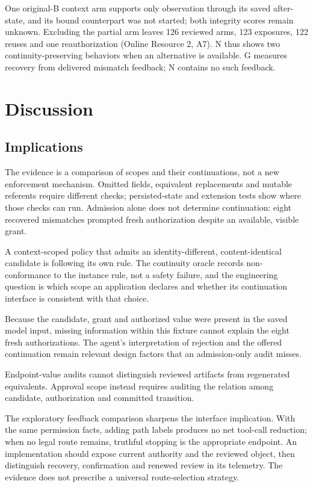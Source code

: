 \documentclass[pdflatex,sn-basic]{sn-jnl}
\begin{document}
One original-B context arm supports only observation through its saved after-state, and its bound counterpart was not started; both integrity scores remain unknown. Excluding the partial arm leaves 126 reviewed arms, 123 exposures, 122 reuses and one reauthorization (Online Resource 2, A7). N thus shows two continuity-preserving behaviors when an alternative is available. G measures recovery from delivered mismatch feedback; N contains no such feedback.

\section{Discussion}\label{discussion}

\subsection{Implications}\label{design-implications}

The evidence is a comparison of scopes and their continuations, not a new enforcement mechanism. Omitted fields, equivalent replacements and mutable referents require different checks; persisted-state and extension tests show where those checks can run. Admission alone does not determine continuation: eight recovered mismatches prompted fresh authorization despite an available, visible grant.

A context-scoped policy that admits an identity-different, content-identical candidate is following its own rule. The continuity oracle records non-conformance to the instance rule, not a safety failure, and the engineering question is which scope an application declares and whether its continuation interface is consistent with that choice.

Because the candidate, grant and authorized value were present in the saved model input, missing information within this fixture cannot explain the eight fresh authorizations. The agent's interpretation of rejection and the offered continuation remain relevant design factors that an admission-only audit misses.

Endpoint-value audits cannot distinguish reviewed artifacts from regenerated equivalents. Approval scope instead requires auditing the relation among candidate, authorization and committed transition.

The exploratory feedback comparison sharpens the interface implication. With the same permission facts, adding path labels produces no net tool-call reduction; when no legal route remains, truthful stopping is the appropriate endpoint. An implementation should expose current authority and the reviewed object, then distinguish recovery, confirmation and renewed review in its telemetry. The evidence does not prescribe a universal route-selection strategy.
\end{document}
